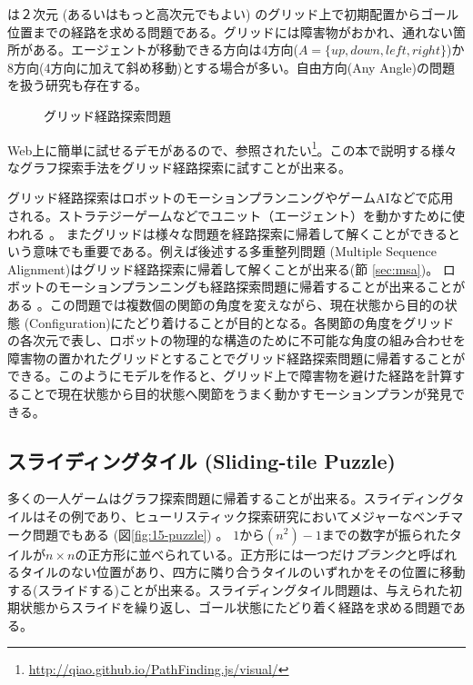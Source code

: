 は２次元 (あるいはもっと高次元でもよい) のグリッド上で初期配置からゴール位置までの経路を求める問題である\cite{yap2002grid}。グリッドには障害物がおかれ、通れない箇所がある。エージェントが移動できる方向は4方向($A= \{up, down, left, right\}$)か8方向(4方向に加えて斜め移動)とする場合が多い。自由方向(Any Angle)の問題を扱う研究も存在する\cite{nash2007theta}。

\begin{figure}
        \centering
        \begin{tikzpicture}[scale=0.5]
          
        \end{tikzpicture}
	\caption{グリッド経路探索問題}
	\label{fig:grid-pathfinding}
\end{figure}


Web上に簡単に試せるデモがあるので、参照されたい\footnote{\url{http://qiao.github.io/PathFinding.js/visual/}}。この本で説明する様々なグラフ探索手法をグリッド経路探索に試すことが出来る。%

グリッド経路探索はロボットのモーションプランニングやゲームAIなどで応用される\cite{algfoor2015comprehensive}。ストラテジーゲームなどでユニット（エージェント）を動かすために使われる \cite{cui2011based,sturtevant2012benchmarks}。%
またグリッドは様々な問題を経路探索に帰着して解くことができるという意味でも重要である。例えば後述する多重整列問題 (Multiple Sequence Alignment)はグリッド経路探索に帰着して解くことが出来る(節 \ref{sec:msa})。
ロボットのモーションプランニングも経路探索問題に帰着することが出来ることがある \cite{barraquand91}。この問題では複数個の関節の角度を変えながら、現在状態から目的の状態 (Configuration)にたどり着けることが目的となる。各関節の角度をグリッドの各次元で表し、ロボットの物理的な構造のために不可能な角度の組み合わせを障害物の置かれたグリッドとすることでグリッド経路探索問題に帰着することができる。このようにモデルを作ると、グリッド上で障害物を避けた経路を計算することで現在状態から目的状態へ関節をうまく動かすモーションプランが発見できる。


\subsection{スライディングタイル (Sliding-tile Puzzle)}

多くの一人ゲームはグラフ探索問題に帰着することが出来る。スライディングタイルはその例であり、ヒューリスティック探索研究においてメジャーなベンチマーク問題でもある (図\ref{fig:15-puzzle}) \cite{johnson1879notes}。
$1$から$(n^2)-1$までの数字が振られたタイルが$n\times n$の正方形に並べられている。正方形には一つだけ{\it ブランク}と呼ばれるタイルのない位置があり、四方に隣り合うタイルのいずれかをその位置に移動する(スライドする)ことが出来る。スライディングタイル問題は、与えられた初期状態からスライドを繰り返し、ゴール状態にたどり着く経路を求める問題である。

